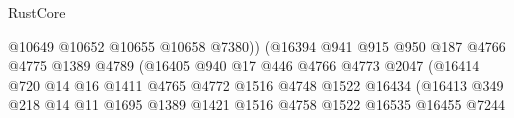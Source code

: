 \begin{lexlean}{RustCore}
\begin{coremodule}
                                                  @10649
                                                  @10652
                                                  @10655
                                                  @10658
                                                  @7380))
                                              (@16394
                                                @941
                                                @915
                                                @950
                                                @187
                                                @4766
                                                @4775
                                                @1389
                                                @4789
                                                (@16405
                                                  @940
                                                  @17
                                                  @446
                                                  @4766
                                                  @4773
                                                  @2047
                                                  (@16414
                                                    @720
                                                    @14
                                                    @16
                                                    @1411
                                                    @4765
                                                    @4772
                                                    @1516
                                                    @4748
                                                    @1522
                                                    @16434
                                                    (@16413
                                                      @349
                                                      @218
                                                      @14
                                                      @11
                                                      @1695
                                                      @1389
                                                      @1421
                                                      @1516
                                                      @4758
                                                      @1522
                                                      @16535
                                                      @16455
                                                      @7244

\end{coremodule}
\end{lexlean}
